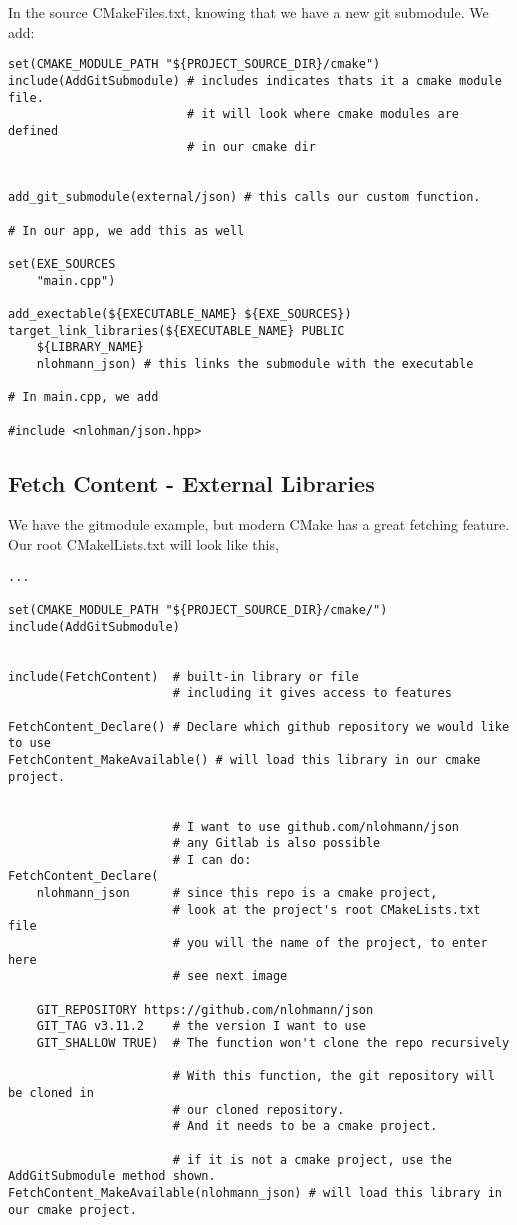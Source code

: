 \documentclass[openany]{report}
\begin{document}
In the source CMakeFiles.txt, knowing that we have a new git submodule. We add:


\begin{verbatim}
set(CMAKE_MODULE_PATH "${PROJECT_SOURCE_DIR}/cmake")
include(AddGitSubmodule) # includes indicates thats it a cmake module file.
                         # it will look where cmake modules are defined
                         # in our cmake dir


add_git_submodule(external/json) # this calls our custom function.

# In our app, we add this as well

set(EXE_SOURCES
    "main.cpp")

add_exectable(${EXECUTABLE_NAME} ${EXE_SOURCES})
target_link_libraries(${EXECUTABLE_NAME} PUBLIC
    ${LIBRARY_NAME}
    nlohmann_json) # this links the submodule with the executable

# In main.cpp, we add 

#include <nlohman/json.hpp>
\end{verbatim}


\subsection{Fetch Content - External Libraries}

We have the gitmodule example, but modern CMake has a great fetching feature. Our root CMakelLists.txt will look like this, 

\begin{verbatim}
...

set(CMAKE_MODULE_PATH "${PROJECT_SOURCE_DIR}/cmake/")
include(AddGitSubmodule)


include(FetchContent)  # built-in library or file
                       # including it gives access to features

FetchContent_Declare() # Declare which github repository we would like to use
FetchContent_MakeAvailable() # will load this library in our cmake project.


                       # I want to use github.com/nlohmann/json
                       # any Gitlab is also possible
                       # I can do:
FetchContent_Declare(
    nlohmann_json      # since this repo is a cmake project,
                       # look at the project's root CMakeLists.txt file
                       # you will the name of the project, to enter here 
                       # see next image

    GIT_REPOSITORY https://github.com/nlohmann/json
    GIT_TAG v3.11.2    # the version I want to use
    GIT_SHALLOW TRUE)  # The function won't clone the repo recursively

                       # With this function, the git repository will be cloned in  
                       # our cloned repository.
                       # And it needs to be a cmake project.

                       # if it is not a cmake project, use the AddGitSubmodule method shown.
FetchContent_MakeAvailable(nlohmann_json) # will load this library in our cmake project.
\end{verbatim}
\end{document}
